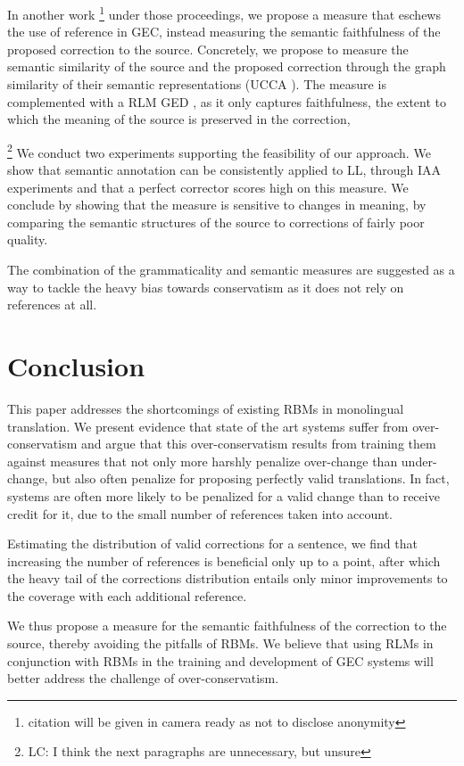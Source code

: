 \documentclass[letterpaper, 11pt]{article}
\newcommand{\lc}[1]{\footnote{\color{blue}LC: #1}}
\begin{document}
In another work \footnote{citation will be given in camera ready as not to disclose anonymity} under those proceedings, we propose a measure that eschews the use
of reference in GEC, instead measuring the semantic faithfulness of the proposed
correction to the source.
Concretely, we propose to measure the semantic similarity of the source and the proposed correction
through the graph similarity of their semantic representations (UCCA \cite{abend2013universal}).
The measure is complemented with a RLM GED \cite{napoles-sakaguchi-tetreault:2016:EMNLP2016}, as it only captures faithfulness, the extent to which
the meaning of the source is preserved in the correction,

\lc{I think the next paragraphs are unnecessary, but unsure}
We conduct two experiments supporting the feasibility of our approach.
We show that semantic annotation can be consistently applied to LL,
through IAA experiments and that a perfect corrector scores high on this measure.
We conclude by showing that the measure is sensitive to changes in meaning, by comparing
the semantic structures of the source to corrections of fairly poor quality.

The combination of the grammaticality and semantic measures are suggested as a way to tackle the heavy bias towards conservatism as it does not rely on references at all. 

\section{Conclusion}

This paper addresses the shortcomings of existing RBMs in monolingual translation.
We present evidence that state of the art systems suffer from over-conservatism and
argue that this over-conservatism results from training them against measures that
not only more harshly penalize over-change than under-change,
but also often penalize for proposing perfectly valid translations.
In fact, systems are often more likely to be penalized for a valid change than to receive credit for it, due to the small number of references taken into account.

Estimating the distribution of valid corrections for a sentence, we find
that increasing the number of references is beneficial only up to a point, after which
the heavy tail of the corrections distribution entails only minor improvements to the coverage with each additional reference.

We thus propose a measure for the semantic faithfulness of the correction to the source,
thereby avoiding the pitfalls of RBMs. We believe that using RLMs in conjunction with RBMs in the training and development of GEC systems will better address the challenge of over-conservatism.
\end{document}
